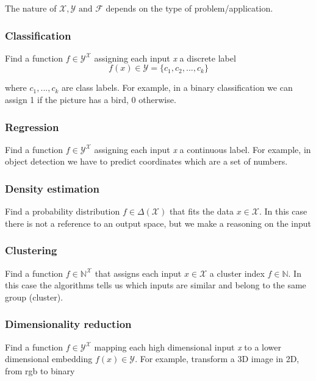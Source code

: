 \documentclass{article}
\begin{document}
The nature of \(\mathcal{X}, \mathcal{Y} \text{ and } \mathcal{F}\) depends on the type of problem/application.

	
\subsubsection*{Classification}

Find a function \(f \in \mathcal{Y}^{\mathcal{X}}\) assigning each input \emph{x} a discrete label
\[f(x) \in \mathcal{Y} = \{c_1, c_2, ..., c_k\}\]

where \(c_1, ..., c_k\) are class labels. 
For example, in a binary classification we can assign 1 if the picture has a bird, 0 otherwise.



\subsubsection*{Regression}

Find a function \(f \in \mathcal{Y}^{\mathcal{X}}\) assigning each input \emph{x} a continuous label. For example, in object detection we have to predict coordinates which are a set of numbers.
	
	
\subsubsection*{Density estimation}
Find a probability distribution \( f \in \Delta(\mathcal{X})\) that fits the data \(x \in \mathcal{X}\). In this case there is not a reference to an output space, but we make a reasoning on the input
	

\subsubsection*{Clustering}
Find a function \(f \in \mathbb{N}^{\mathcal{X}}\) that assigns each input \(x \in \mathcal{X}\) a cluster index \(f \in \mathbb{N}\). In this case the algorithms tells us which inputs are similar and  belong to the same group (cluster).
	
	
\subsubsection*{Dimensionality reduction}
Find a function \(f \in \mathcal{Y}^{\mathcal{X}}\) mapping each high dimensional input \emph{x} to a lower dimensional embedding \(f(x) \in \mathcal{Y}\). For example, transform a 3D image in 2D, from rgb to binary
\end{document}
